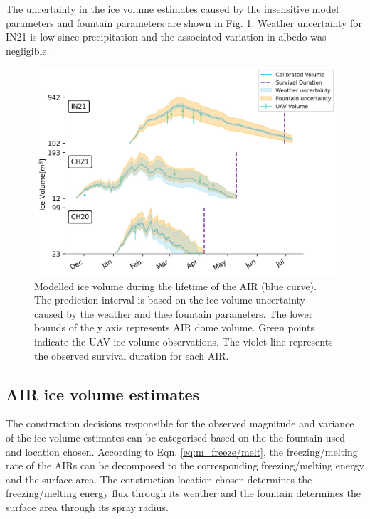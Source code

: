 \documentclass[utf8]{frontiersSCNS} %
\begin{document}
The uncertainty in the ice volume estimates caused by the insensitive model parameters and fountain parameters are shown in Fig.
\ref{fig:results}. Weather uncertainty for IN21 is low since precipitation and the associated variation in albedo
was negligible.

\begin{figure}
	\begin{center}
		\includegraphics[width=\linewidth]{Figures/icev_results.jpg}
	\end{center}
	\caption{Modelled ice volume during the lifetime of the AIR (blue curve). The prediction interval is based on the
		ice volume uncertainty caused by the weather and thee fountain parameters. The lower bounds of the y axis
		represents AIR dome volume. Green points indicate the UAV ice volume observations.  The violet line represents the
		observed survival duration for each AIR.  }

	\label{fig:results}
\end{figure}

\subsection{AIR ice volume estimates}

The construction decisions responsible for the observed magnitude and variance of the ice volume estimates can be
categorised based on the the fountain used and location chosen. According to Eqn. \ref{eq:m_freeze/melt}, the
freezing/melting rate of the AIRs can be decomposed to the corresponding freezing/melting energy and the surface
area. The construction location chosen determines the freezing/melting energy flux through its weather and the
fountain determines the surface area through its spray radius.
\end{document}
